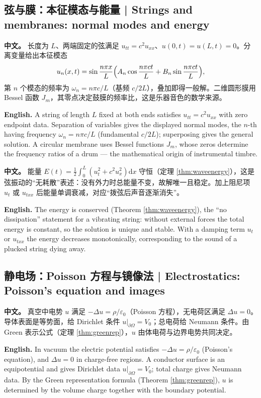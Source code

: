 \documentclass[UTF8,11pt,a4paper]{ctexart}
\newcommand{\APS}[2]{\par\noindent\textbf{中文。} #1\par\noindent\textbf{English.} #2\par\smallskip}
\newcommand{\dd}{\mathrm{d}}
\begin{document}
\subsection{弦与膜：本征模态与能量 | Strings and membranes: normal modes and energy}
\APS{长度为 $L$、两端固定的弦满足 $u_{tt}=c^2u_{xx}$、$u(0,t)=u(L,t)=0$。分离变量给出本征模态
\[
u_n(x,t)=\sin\frac{n\pi x}{L}\Bigl(A_n\cos\frac{n\pi ct}{L}+B_n\sin\frac{n\pi ct}{L}\Bigr),
\]
第 $n$ 个模态的频率为 $\omega_n=n\pi c/L$（基频 $c/2L$），叠加即得一般解。二维圆形膜用 Bessel 函数 $J_m$，其零点决定鼓膜的频率比，这是乐器音色的数学来源。}{A string of length $L$ fixed at both ends satisfies $u_{tt}=c^2u_{xx}$ with zero endpoint data. Separation of variables gives the displayed normal modes, the $n$-th having frequency $\omega_n=n\pi c/L$ (fundamental $c/2L$); superposing gives the general solution. A circular membrane uses Bessel functions $J_m$, whose zeros determine the frequency ratios of a drum — the mathematical origin of instrumental timbre.}

\APS{能量 $E(t)=\frac12\int_0^L(u_t^2+c^2u_x^2)\dd x$ 守恒（定理 \ref{thm:waveenergy}），这是弦振动的``无耗散''表述：没有外力时总能量不变，故解唯一且稳定。加上阻尼项 $u_t$ 或 $u_{txx}$ 后能量单调衰减，对应``拨弦后声音逐渐消失''。}{The energy is conserved (Theorem \ref{thm:waveenergy}), the ``no dissipation'' statement for a vibrating string: without external forces the total energy is constant, so the solution is unique and stable. With a damping term $u_t$ or $u_{txx}$ the energy decreases monotonically, corresponding to the sound of a plucked string dying away.}

\subsection{静电场：Poisson 方程与镜像法 | Electrostatics: Poisson's equation and images}
\APS{真空中电势 $u$ 满足 $-\Delta u=\rho/\varepsilon_0$（Poisson 方程），无电荷区满足 $\Delta u=0$。导体表面是等势面，给 Dirichlet 条件 $u|_{\partial\Omega}=V_0$；总电荷给 Neumann 条件。由 Green 表示公式（定理 \ref{thm:greenrep}），$u$ 由体电荷与边界电势共同决定。}{In vacuum the electric potential satisfies $-\Delta u=\rho/\varepsilon_0$ (Poisson's equation), and $\Delta u=0$ in charge-free regions. A conductor surface is an equipotential and gives Dirichlet data $u|_{\partial\Omega}=V_0$; total charge gives Neumann data. By the Green representation formula (Theorem \ref{thm:greenrep}), $u$ is determined by the volume charge together with the boundary potential.}
\end{document}
